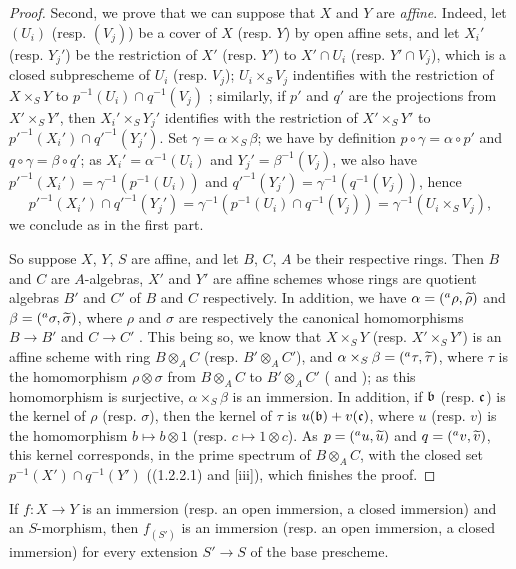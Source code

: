 \begin{proof}
Second, we prove that we can suppose that $X$ and $Y$ are \emph{affine}.
Indeed, let $(U_i)$ (resp. $(V_j)$) be a cover of $X$ (resp. $Y$) by open affine sets, and let $X_i'$ (resp. $Y_j'$) be the restriction of $X'$ (resp. $Y'$) to $X'\cap U_i$ (resp. $Y'\cap V_j$), which is a closed subprescheme of $U_i$ (resp. $V_j$); $U_i\times_S V_j$ indentifies with the restriction of $X\times_S Y$ to $p^{-1}(U_i)\cap q^{-1}(V_j)$ ; similarly, if $p'$ and $q'$ are the projections from $X'\times_S Y'$, then $X_i'\times_S Y_j'$ identifies with the restriction of $X'\times_S Y'$ to ${p'}^{-1}(X_i')\cap{q'}^{-1}(Y_j')$.
Set $\gamma=\alpha\times_S\beta$; we have by definition $p\circ\gamma=\alpha\circ p'$ and $q\circ\gamma=\beta\circ q'$; as $X_i'=\alpha^{-1}(U_i)$ and $Y_j'=\beta^{-1}(V_j)$, we also have ${p'}^{-1}(X_i')=\gamma^{-1}(p^{-1}(U_i))$ and ${q'}^{-1}(Y_j')=\gamma^{-1}(q^{-1}(V_j))$, hence
\[
  {p'}^{-1}(X_i')\cap{q'}^{-1}(Y_j')=\gamma^{-1}(p^{-1}(U_i)\cap q^{-1}(V_j))=\gamma^{-1}(U_i\times_S V_j),
\]
we conclude as in the first part.

So suppose $X$, $Y$, $S$ are affine, and let $B$, $C$, $A$ be their respective rings.
Then $B$ and $C$ are $A$-algebras, $X'$ and $Y'$ are affine schemes whose rings are quotient algebras $B'$ and $C'$ of $B$ and $C$ respectively.
In addition, we have $\alpha=({}^a\rho,\widetilde{\rho})$ and $\beta=({}^a\sigma,\widetilde{\sigma})$, where $\rho$ and $\sigma$ are respectively the canonical homomorphisms $B\to B'$ and $C\to C'$ .
This being so, we know that $X\times_S Y$ (resp. $X'\times_S Y'$) is an affine scheme with ring $B\otimes_A C$ (resp. $B'\otimes_A C'$), and $\alpha\times_S\beta=({}^a\tau,\widetilde{\tau})$, where $\tau$ is the homomorphism $\rho\otimes\sigma$ from $B\otimes_A C$ to $B'\otimes_A C'$ ( and ); as this homomorphism is surjective, $\alpha\times_S\beta$ is an immersion.
In addition, if $\mathfrak{b}$ (resp. $\mathfrak{c}$) is the kernel of $\rho$ (resp. $\sigma$), then the kernel of $\tau$ is $u(\mathfrak{b})+v(\mathfrak{c})$, where $u$ (resp. $v$) is the homomorphism $b\mapsto b\otimes 1$ (resp. $c\mapsto 1\otimes c$).
As $p=({}^a u,\widetilde{u})$ and $q=({}^a v,\widetilde{v})$, this kernel corresponds, in the prime spectrum of $B\otimes_A C$, with the closed set $p^{-1}(X')\cap q^{-1}(Y')$ ((1.2.2.1) and [iii]), which finishes the proof.
\end{proof}

\begin{cor}[4.3.2]
\label{1.4.3.2}
If $f:X\to Y$ is an immersion (resp. an open immersion, a closed immersion) and an $S$-morphism, then $f_{(S')}$ is an immersion (resp. an open immersion, a closed immersion) for every extension $S'\to S$ of the base prescheme.
\end{cor}

